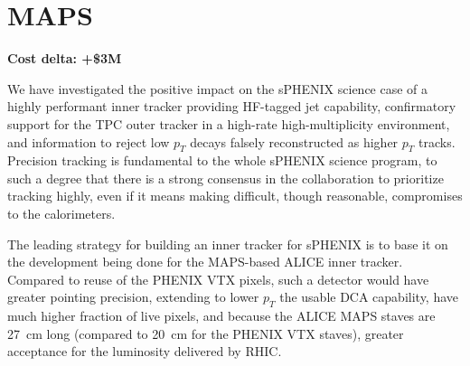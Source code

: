 \section{MAPS}
\label{maps}

\textbf{Cost delta: +\$3M}

We have investigated the positive impact on the sPHENIX science case
of a highly performant inner tracker providing HF-tagged jet
capability, confirmatory support for the TPC outer tracker in a
high-rate high-multiplicity environment, and information to reject low
$p_T$ decays falsely reconstructed as higher $p_T$ tracks.  Precision
tracking is fundamental to the whole sPHENIX science program, to such
a degree that there is a strong consensus in the collaboration to
prioritize tracking highly, even if it means making difficult, though
reasonable, compromises to the calorimeters.

The leading strategy for building an inner tracker for sPHENIX is to
base it on the development being done for the MAPS-based ALICE inner
tracker.  Compared to reuse of the PHENIX VTX pixels, such a detector
would have greater pointing precision, extending to lower $p_T$ the
usable DCA capability, have much higher fraction of live pixels, and
because the ALICE MAPS staves are 27~cm long (compared to 20~cm for
the PHENIX VTX staves), greater acceptance for the luminosity
delivered by RHIC.

